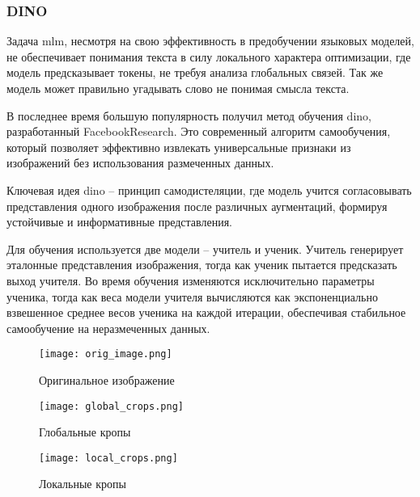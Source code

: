 \documentclass[../part_1.tex]{subfiles}
\begin{document}
    \subsubsection{DINO}
    \par Задача \acrshort{mlm}, несмотря на свою эффективность в предобучении языковых моделей, не обеспечивает понимания текста в силу локального характера оптимизации, где модель предсказывает токены, не требуя анализа глобальных связей. Так же модель может правильно угадывать слово не понимая смысла текста.
    \par В последнее время большую популярность получил метод обучения \acrshort{dino}\cite{caron2021emergingpropertiesselfsupervisedvision, oquab2024dinov2learningrobustvisual, darcet2024visiontransformersneedregisters}, разработанный FacebookResearch. Это современный алгоритм самообучения, который позволяет эффективно извлекать универсальные признаки из изображений без использования размеченных данных. 
    \par Ключевая идея \acrshort{dino} -- принцип самодистеляции, где модель учится согласовывать представления одного изображения после различных аугментаций, формируя устойчивые и информативные представления. 
    \par Для обучения используется две модели -- учитель и ученик. Учитель генерирует эталонные представления изображения, тогда как ученик пытается предсказать выход учителя. Во время обучения изменяются исключительно параметры ученика, тогда как веса модели учителя вычисляются как экспоненциально взвешенное среднее весов ученика на каждой итерации, обеспечивая стабильное самообучение на неразмеченных данных.
    \begin{figure*}[h]
        \begin{subfigure}{0.33\textwidth}
            \texttt{[image: orig\_image.png]}
            \caption{Оригинальное изображение}
        \end{subfigure}%
        \hfill
        \begin{subfigure}{0.33\textwidth}
            \texttt{[image: global\_crops.png]}
            \caption{Глобальные кропы}
        \end{subfigure}%
        \hfill
        \begin{subfigure}{0.33\textwidth}
            \texttt{[image: local\_crops.png]}
            \caption{Локальные кропы}
        \end{subfigure}%
        \label{fig:multicrop_augment}
    \end{figure*}
\end{document}
